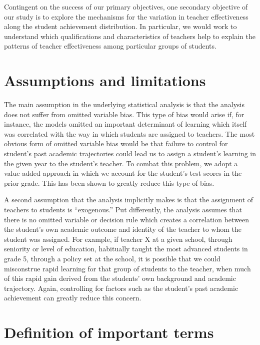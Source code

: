 \documentclass[letterpaper,12pt]{article}
\begin{document}
Contingent on the success of our primary objectives, one secondary objective of our study is to explore the mechanisms for the variation in teacher effectiveness along the student achievement distribution. In particular, we would work to understand which qualifications and characteristics of teachers help to explain the patterns of teacher effectiveness among particular groups of students.





\section{Assumptions and limitations}
The main assumption in the underlying statistical analysis is that the analysis does not suffer from omitted variable bias. This type of bias would arise if, for instance, the models omitted an important determinant of learning which itself was correlated with the way in which students are assigned to teachers. The most obvious form of omitted variable bias would be that failure to control for student's past academic trajectories could lead us to assign a student's learning in the given year to the student's teacher. To combat this problem, we adopt a value-added approach in which we account for the student's test scores in the prior grade. This has been shown to greatly reduce this type of bias.  

A second assumption that the analysis implicitly makes is that the assignment of teachers to students is ``exogenous.'' Put differently, the analysis assumes that there is no omitted variable or decision rule which creates a correlation between the student's own academic outcome and identity of the teacher to whom the student was assigned. For example, if teacher X at a given school, through seniority or level of education, habitually taught the most advanced students in grade 5, through a policy set at the school, it is possible that we could misconstrue rapid learning for that group of students to the teacher, when much of this rapid gain derived from the students' own background and academic trajectory.  Again, controlling for factors such as the student's past academic achievement can greatly reduce this concern.





\section{Definition of important terms}
\end{document}
